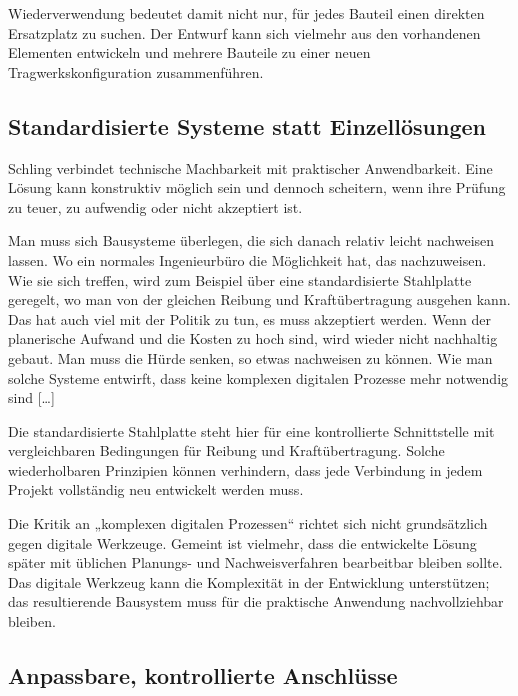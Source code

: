 Wiederverwendung bedeutet damit nicht nur, für jedes Bauteil einen direkten Ersatzplatz zu suchen. Der Entwurf kann sich vielmehr aus den vorhandenen Elementen entwickeln und mehrere Bauteile zu einer neuen Tragwerkskonfiguration zusammenführen.

\subsection{Standardisierte Systeme statt Einzellösungen}

Schling verbindet technische Machbarkeit mit praktischer Anwendbarkeit. Eine Lösung kann konstruktiv möglich sein und dennoch scheitern, wenn ihre Prüfung zu teuer, zu aufwendig oder nicht akzeptiert ist.

\begin{Blockquote}
Man muss sich Bausysteme überlegen, die sich danach relativ leicht nachweisen lassen. Wo ein normales Ingenieurbüro die Möglichkeit hat, das nachzuweisen. Wie sie sich treffen, wird zum Beispiel über eine standardisierte Stahlplatte geregelt, wo man von der gleichen Reibung und Kraftübertragung ausgehen kann. Das hat auch viel mit der Politik zu tun, es muss akzeptiert werden. Wenn der planerische Aufwand und die Kosten zu hoch sind, wird wieder nicht nachhaltig gebaut. Man muss die Hürde senken, so etwas nachweisen zu können. Wie man solche Systeme entwirft, dass keine komplexen digitalen Prozesse mehr notwendig sind […]
\end{Blockquote}

Die standardisierte Stahlplatte steht hier für eine kontrollierte Schnittstelle mit vergleichbaren Bedingungen für Reibung und Kraftübertragung. Solche wiederholbaren Prinzipien können verhindern, dass jede Verbindung in jedem Projekt vollständig neu entwickelt werden muss.

Die Kritik an „komplexen digitalen Prozessen“ richtet sich nicht grundsätzlich gegen digitale Werkzeuge. Gemeint ist vielmehr, dass die entwickelte Lösung später mit üblichen Planungs- und Nachweisverfahren bearbeitbar bleiben sollte. Das digitale Werkzeug kann die Komplexität in der Entwicklung unterstützen; das resultierende Bausystem muss für die praktische Anwendung nachvollziehbar bleiben.

\subsection{Anpassbare, kontrollierte Anschlüsse}

